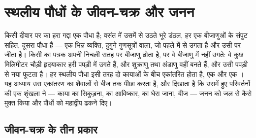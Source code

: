 \chapter{स्थलीय पौधों के जीवन-चक्र और जनन}\label{ch:b2:plant-life-cycles}

किसी दीवार पर  का हरा गद्दा एक पौधा है; वसंत में उसमें से उठते भूरे
डंठल, हर एक बीजाणुओं के संपुट सहित, दूसरा पौधा हैं --- एक भिन्न व्यक्ति,
दुगुने गुणसूत्रों वाला, जो पहले में से उगता है और उसी पर जीता है। किसी
 का पत्रक अपनी निचली सतह पर बीजाणु ढोता है, पर वे बीजाणु  में
नहीं उगते: वे कुछ मिलिमीटर चौड़ी हृदयाकार हरी पपड़ी में उगते हैं, और
शुक्राणु तथा अंडाणु वहीं बनते हैं, और उसी पपड़ी से नया  फूटता है।
हर स्थलीय पौधा इसी तरह दो कायाओं के बीच एकांतरित होता है, एक  और
एक । यह अध्याय उस एकांतरण का शैवालों से बीज तक पीछा करता है,
और दिखाता है कि उसमें हुए परिवर्तनों की एक शृंखला ने ---  काया का
सिकुड़ना,  का आविष्कार,  का घेरा जाना, बीज --- जनन को जल से
कैसे मुक्त किया और पौधों को महाद्वीप ढकने दिए।

\section{जीवन-चक्र के तीन प्रकार}

